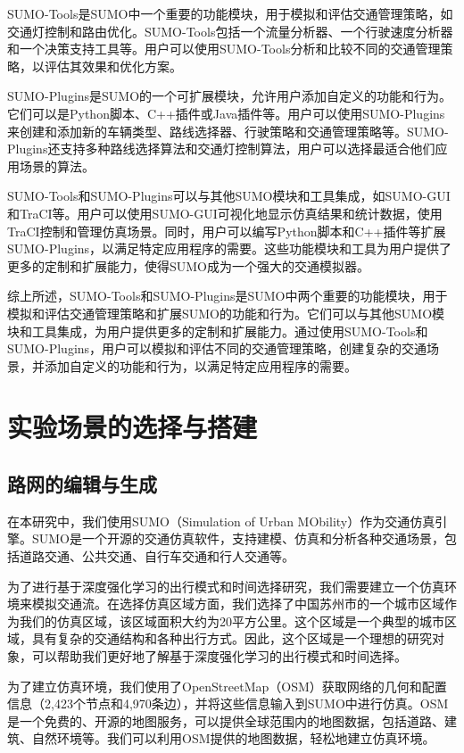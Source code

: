 SUMO-Tools是SUMO中一个重要的功能模块，用于模拟和评估交通管理策略，如交通灯控制和路由优化。SUMO-Tools包括一个流量分析器、一个行驶速度分析器和一个决策支持工具等。用户可以使用SUMO-Tools分析和比较不同的交通管理策略，以评估其效果和优化方案。

SUMO-Plugins是SUMO的一个可扩展模块，允许用户添加自定义的功能和行为。它们可以是Python脚本、C++插件或Java插件等。用户可以使用SUMO-Plugins来创建和添加新的车辆类型、路线选择器、行驶策略和交通管理策略等。SUMO-Plugins还支持多种路线选择算法和交通灯控制算法，用户可以选择最适合他们应用场景的算法。

SUMO-Tools和SUMO-Plugins可以与其他SUMO模块和工具集成，如SUMO-GUI和TraCI等。用户可以使用SUMO-GUI可视化地显示仿真结果和统计数据，使用TraCI控制和管理仿真场景。同时，用户可以编写Python脚本和C++插件等扩展SUMO-Plugins，以满足特定应用程序的需要。这些功能模块和工具为用户提供了更多的定制和扩展能力，使得SUMO成为一个强大的交通模拟器。

综上所述，SUMO-Tools和SUMO-Plugins是SUMO中两个重要的功能模块，用于模拟和评估交通管理策略和扩展SUMO的功能和行为。它们可以与其他SUMO模块和工具集成，为用户提供更多的定制和扩展能力。通过使用SUMO-Tools和SUMO-Plugins，用户可以模拟和评估不同的交通管理策略，创建复杂的交通场景，并添加自定义的功能和行为，以满足特定应用程序的需要。


\section{实验场景的选择与搭建}

\subsection{路网的编辑与生成}

在本研究中，我们使用SUMO（Simulation of Urban MObility）作为交通仿真引擎。SUMO是一个开源的交通仿真软件，支持建模、仿真和分析各种交通场景，包括道路交通、公共交通、自行车交通和行人交通等。

为了进行基于深度强化学习的出行模式和时间选择研究，我们需要建立一个仿真环境来模拟交通流。在选择仿真区域方面，我们选择了中国苏州市的一个城市区域作为我们的仿真区域，该区域面积大约为20平方公里。这个区域是一个典型的城市区域，具有复杂的交通结构和各种出行方式。因此，这个区域是一个理想的研究对象，可以帮助我们更好地了解基于深度强化学习的出行模式和时间选择。

为了建立仿真环境，我们使用了OpenStreetMap（OSM）获取网络的几何和配置信息（2,423个节点和4,970条边），并将这些信息输入到SUMO中进行仿真。OSM是一个免费的、开源的地图服务，可以提供全球范围内的地图数据，包括道路、建筑、自然环境等。我们可以利用OSM提供的地图数据，轻松地建立仿真环境。

